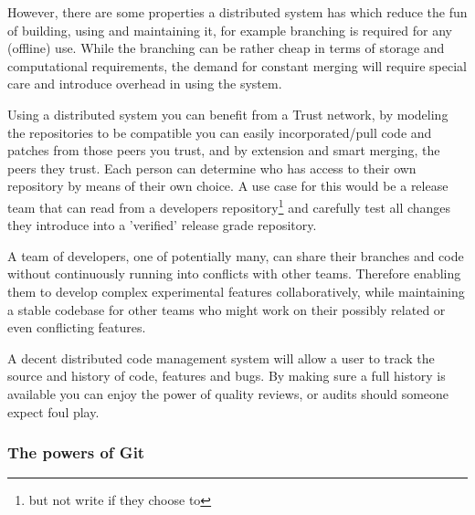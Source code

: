 However, there are some properties a distributed system has which reduce the fun of building, using and maintaining it,
for example branching is required for any (offline) use. While the branching can
be rather cheap in terms of storage and computational requirements, the demand
for constant merging will require special care and introduce overhead in using
the system.


Using a distributed system you can benefit from a Trust network, by modeling
the repositories to be compatible you can easily incorporated/pull code and patches
from those peers you trust, and by extension and smart merging, the peers they
trust. Each person can determine who has access to their own repository by means
of their own choice. A use case for this would be a release team that can read
from a developers repository\footnote{but not write if they choose to} and
carefully test all changes they introduce into a 'verified' release grade
repository.

A team of developers, one of potentially many, can share their branches and
code without continuously running into conflicts with other teams. Therefore enabling them to
develop complex experimental features collaboratively, while maintaining a stable codebase for
other teams who might work on their possibly related or even conflicting features.


A decent distributed code management system will allow a user to track the source and history of code, features and bugs.
By making sure a full history is available you can enjoy the power of quality reviews, or audits should someone expect foul play.


\subsubsection{The powers of Git}

